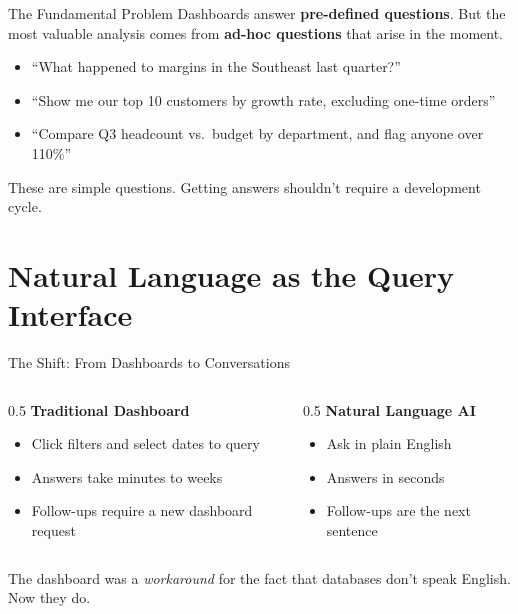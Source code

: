 \documentclass[aspectratio=169]{beamer}
\begin{document}
\begin{frame}{The Fundamental Problem}
Dashboards answer \textbf{pre-defined questions}. But the most valuable analysis comes from \textbf{ad-hoc questions} that arise in the moment.
\vspace{0.3cm}
\begin{itemize}
  \item ``What happened to margins in the Southeast last quarter?''
  \item ``Show me our top 10 customers by growth rate, excluding one-time orders''
  \item ``Compare Q3 headcount vs.\ budget by department, and flag anyone over 110\%''
\end{itemize}
\vspace{0.3cm}
These are simple questions. Getting answers shouldn't require a development cycle.
\end{frame}

\section{Natural Language as the Query Interface}

\begin{frame}{The Shift: From Dashboards to Conversations}
\begin{columns}[T]
\begin{column}{0.5\textwidth}
\textbf{Traditional Dashboard}
\begin{itemize}\small
  \item Click filters and select dates to query
  \item Answers take minutes to weeks
  \item Follow-ups require a new dashboard request
\end{itemize}
\end{column}
\begin{column}{0.5\textwidth}
\textbf{Natural Language AI}
\begin{itemize}\small
  \item Ask in plain English
  \item Answers in seconds
  \item Follow-ups are the next sentence
\end{itemize}
\end{column}
\end{columns}
\vspace{0.5cm}
\centering
The dashboard was a \textit{workaround} for the fact that databases don't speak English. Now they do.
\end{frame}
\end{document}
